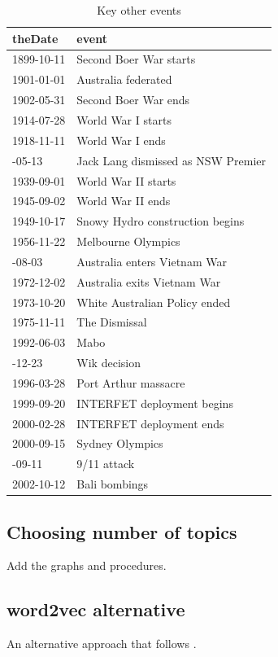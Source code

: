 \documentclass[12pt,]{article}
\theoremstyle{definition}
\theoremstyle{definition}
\theoremstyle{definition}
\theoremstyle{remark}
\begin{document}
\begin{table}

\caption{\label{tab:others}Key other events}
\centering
\fontsize{8}{10}\selectfont
\begin{tabular}[t]{ll}
\toprule
theDate & event\\
\midrule
1899-10-11 & Second Boer War starts\\
1901-01-01 & Australia federated\\
1902-05-31 & Second Boer War ends\\
1914-07-28 & World War I starts\\
1918-11-11 & World War I ends\\
\addlinespace
1932-05-13 & Jack Lang dismissed as NSW Premier\\
1939-09-01 & World War II starts\\
1945-09-02 & World War II ends\\
1949-10-17 & Snowy Hydro construction begins\\
1956-11-22 & Melbourne Olympics\\
\addlinespace
1962-08-03 & Australia enters Vietnam War\\
1972-12-02 & Australia exits Vietnam War\\
1973-10-20 & White Australian Policy ended\\
1975-11-11 & The Dismissal\\
1992-06-03 & Mabo\\
\addlinespace
1996-12-23 & Wik decision\\
1996-03-28 & Port Arthur massacre\\
1999-09-20 & INTERFET deployment begins\\
2000-02-28 & INTERFET deployment ends\\
2000-09-15 & Sydney Olympics\\
\addlinespace
2001-09-11 & 9/11 attack\\
2002-10-12 & Bali bombings\\
\bottomrule
\end{tabular}
\end{table}

\subsection{Choosing number of topics}\label{choosing-number-of-topics}

Add the graphs and procedures.

\subsection{word2vec alternative}\label{word2vec-alternative}

An alternative approach that follows \citet{Taddy2015}.

\newpage




\newpage
\singlespacing 
\renewcommand\refname{References}

\end{document}
